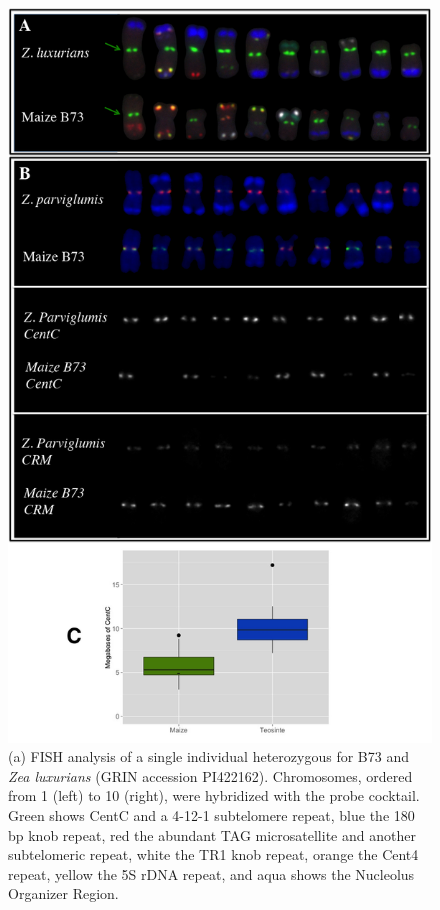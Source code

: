 \begin{figure}
\centering
\includegraphics[width=1\textwidth]{Fig4_kelly2}
\caption{(a) FISH analysis of a single individual heterozygous for B73 and \emph{Zea luxurians} (GRIN accession PI422162).
Chromosomes, ordered from 1 (left) to 10 (right), were hybridized with the \citet{kato2004paint} probe cocktail. 
Green shows CentC and a 4-12-1 subtelomere repeat, blue the 180 bp knob repeat, red the abundant TAG microsatellite and another subtelomeric repeat, white the TR1 knob repeat, orange the Cent4 repeat, yellow the 5S rDNA repeat, and aqua shows the Nucleolus Organizer Region.
}
\end{figure}
